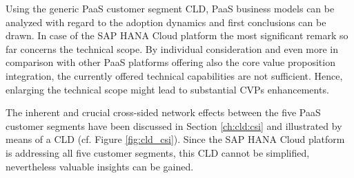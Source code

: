 Using the generic \ac{PaaS} customer segment \ac{CLD}, \ac{PaaS} business models can be analyzed with regard to the adoption dynamics and first conclusions can be drawn. In case of the SAP HANA Cloud platform the most significant remark so far concerns the technical scope. By individual consideration and even more in comparison with other \ac{PaaS} platforms offering also the core value proposition integration, the currently offered technical capabilities are not sufficient. Hence, enlarging the technical scope might lead to substantial \acp{CVP} enhancements.

The inherent and crucial cross-sided network effects between the five \ac{PaaS} customer segments have been discussed in Section \ref{ch:cld:csi} and illustrated by means of a \ac{CLD} (cf. Figure \ref{fig:cld_csi}). Since the SAP HANA Cloud platform is addressing all five customer segments, this \ac{CLD} cannot be simplified, nevertheless valuable insights can be gained.

